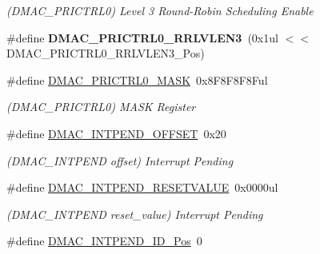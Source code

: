 \begin{DoxyCompactItemize}
\begin{DoxyCompactList}\small\item\em (D\+M\+A\+C\+\_\+\+P\+R\+I\+C\+T\+R\+L0) Level 3 Round-\/\+Robin Scheduling Enable \end{DoxyCompactList}\item 
\hypertarget{group___s_a_m_l21___d_m_a_c_ga3e023afbcc4555947c52d7352fed88bf}{}\#define {\bfseries D\+M\+A\+C\+\_\+\+P\+R\+I\+C\+T\+R\+L0\+\_\+\+R\+R\+L\+V\+L\+E\+N3}~(0x1ul $<$$<$ D\+M\+A\+C\+\_\+\+P\+R\+I\+C\+T\+R\+L0\+\_\+\+R\+R\+L\+V\+L\+E\+N3\+\_\+\+Pos)\label{group___s_a_m_l21___d_m_a_c_ga3e023afbcc4555947c52d7352fed88bf}

\item 
\hypertarget{group___s_a_m_l21___d_m_a_c_ga41dd468fc48dfb17c9cce32007da8b4c}{}\#define \hyperlink{group___s_a_m_l21___d_m_a_c_ga41dd468fc48dfb17c9cce32007da8b4c}{D\+M\+A\+C\+\_\+\+P\+R\+I\+C\+T\+R\+L0\+\_\+\+M\+A\+S\+K}~0x8\+F8\+F8\+F8\+Ful\label{group___s_a_m_l21___d_m_a_c_ga41dd468fc48dfb17c9cce32007da8b4c}

\begin{DoxyCompactList}\small\item\em (D\+M\+A\+C\+\_\+\+P\+R\+I\+C\+T\+R\+L0) M\+A\+S\+K Register \end{DoxyCompactList}\item 
\hypertarget{group___s_a_m_l21___d_m_a_c_ga6a086878ea099fa86d50f9af7274fc15}{}\#define \hyperlink{group___s_a_m_l21___d_m_a_c_ga6a086878ea099fa86d50f9af7274fc15}{D\+M\+A\+C\+\_\+\+I\+N\+T\+P\+E\+N\+D\+\_\+\+O\+F\+F\+S\+E\+T}~0x20\label{group___s_a_m_l21___d_m_a_c_ga6a086878ea099fa86d50f9af7274fc15}

\begin{DoxyCompactList}\small\item\em (D\+M\+A\+C\+\_\+\+I\+N\+T\+P\+E\+N\+D offset) Interrupt Pending \end{DoxyCompactList}\item 
\hypertarget{group___s_a_m_l21___d_m_a_c_gadf4518105b2b9f4ee022dcc22dd0296f}{}\#define \hyperlink{group___s_a_m_l21___d_m_a_c_gadf4518105b2b9f4ee022dcc22dd0296f}{D\+M\+A\+C\+\_\+\+I\+N\+T\+P\+E\+N\+D\+\_\+\+R\+E\+S\+E\+T\+V\+A\+L\+U\+E}~0x0000ul\label{group___s_a_m_l21___d_m_a_c_gadf4518105b2b9f4ee022dcc22dd0296f}

\begin{DoxyCompactList}\small\item\em (D\+M\+A\+C\+\_\+\+I\+N\+T\+P\+E\+N\+D reset\+\_\+value) Interrupt Pending \end{DoxyCompactList}\item 
\hypertarget{group___s_a_m_l21___d_m_a_c_ga725ca18c42f6b625eec02028ff6f7f3a}{}\#define \hyperlink{group___s_a_m_l21___d_m_a_c_ga725ca18c42f6b625eec02028ff6f7f3a}{D\+M\+A\+C\+\_\+\+I\+N\+T\+P\+E\+N\+D\+\_\+\+I\+D\+\_\+\+Pos}~0\label{group___s_a_m_l21___d_m_a_c_ga725ca18c42f6b625eec02028ff6f7f3a}


\end{DoxyCompactItemize}
